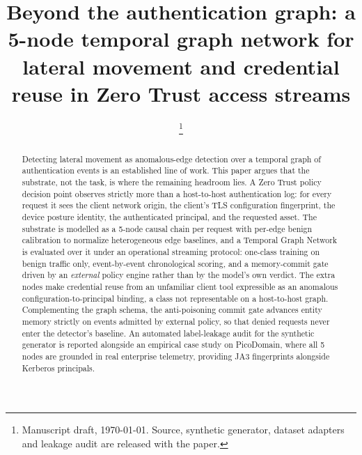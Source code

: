 \documentclass[journal,twocolumn]{IEEEtran}
\newif\ifpreliminary
\begin{document}
\title{Beyond the authentication graph: a 5-node temporal graph network
for lateral movement and credential reuse in Zero Trust access streams}

\author{%
  \thanks{Manuscript draft, \today. Source, synthetic generator, dataset adapters and
  leakage audit are released with the paper.}%
}

\maketitle

\ifpreliminary
\begin{center}
\fcolorbox{red!60!black}{red!6}{%
  \begin{minipage}{0.94\columnwidth}\small
  \textbf{Preliminary draft.} Every figure in Section~\ref{sec:results} is a
  placeholder carried from runs on the closed-world generator (v4), which predate the
  open-world generator v5 of 2026-09-21 and are \emph{not} reproducible from the
  current code. The evaluation protocol is being revised (TGN against an Isolation
  Forest and stateful lookup rules); the qualitative claims are pending that
  evaluation, and so are the numbers.
  \end{minipage}}
\end{center}
\vspace{2mm}
\fi

\begin{abstract}
Detecting lateral movement as anomalous-edge detection over a temporal graph of
authentication events is an established line of work. This paper argues that the
substrate, not the task, is where the remaining headroom lies. A Zero Trust policy
decision point observes strictly more than a host-to-host authentication log: for
every request it sees the client network origin, the client's TLS configuration
fingerprint, the device posture identity, the authenticated principal, and the
requested asset. The substrate is modelled as a 5-node causal chain per request with per-edge benign
calibration to normalize heterogeneous edge baselines, and a Temporal Graph Network is evaluated
over it under an operational streaming protocol: one-class training on benign traffic only, event-by-event
chronological scoring, and a memory-commit gate driven by an \emph{external} policy
engine rather than by the model's own verdict. The extra nodes make credential reuse
from an unfamiliar client tool expressible as an anomalous
configuration-to-principal binding, a class not representable on a host-to-host
graph. Complementing the graph schema, the anti-poisoning commit gate advances entity
memory strictly on events admitted by external policy, so that denied requests never
enter the detector's baseline. An automated label-leakage audit for the synthetic generator is reported alongside
an empirical case study on PicoDomain, where all 5 nodes are grounded in real
enterprise telemetry, providing JA3 fingerprints alongside Kerberos principals.
\end{abstract}
\end{document}

